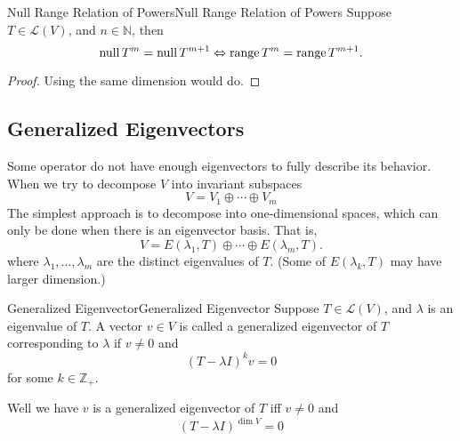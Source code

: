 \documentclass[../main.tex]{subfiles}
\begin{document}
\begin{proposition}{Null Range Relation of Powers}{Null Range Relation of Powers}
Suppose $T\in \mathscr{L}(V)$, and $n\in \mathbb{N}$, then
\begin{equation*}
\operatorname{null} T^m = \operatorname{null} T^{m+1} \Leftrightarrow \operatorname{range} T^m = \operatorname{range} T^{m+1}.
\end{equation*}
\end{proposition}
\begin{proof}
Using the same dimension would do.
\end{proof}

\subsection{Generalized Eigenvectors}

Some operator do not have enough eigenvectors to fully describe its behavior. When we try to decompose $V$ into invariant subspaces
\begin{equation*}
V = V_1 \oplus \cdots \oplus V_m
\end{equation*}
The simplest approach is to decompose into one-dimensional spaces, which can only be done when there is an eigenvector basis. That is,
\begin{equation*}
V = E(\lambda_1, T) \oplus \cdots \oplus E(\lambda_m,T).
\end{equation*}
where $\lambda_1, \ldots ,\lambda_m$ are the distinct eigenvalues of $T$. (Some of $E(\lambda_k,T)$ may have larger dimension.)

\begin{definition}{Generalized Eigenvector}{Generalized Eigenvector}
Suppose $T\in \mathscr{L}(V)$, and $\lambda$ is an eigenvalue of $T$. A vector $v\in V$ is called a generalized eigenvector of $T$ corresponding to  $\lambda$ if $v\neq 0$ and
\begin{equation*}
	(T-\lambda I)^kv = 0
\end{equation*}
for some $k\in \mathbb{Z}_+$.
\end{definition}
Well we have $v$ is a generalized eigenvector of $T$ iff $v\neq 0$ and 
\begin{equation*}
	(T-\lambda I)^{\dim V} = 0
\end{equation*}
\end{document}
